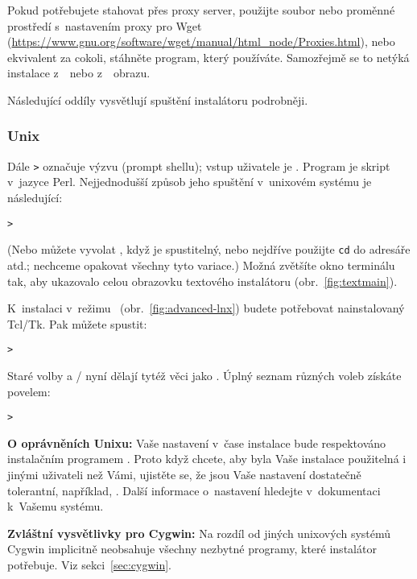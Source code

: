 \documentclass[\classoptions,slovak,english,czech]{\classname}
\begin{document}
Pokud potřebujete stahovat přes proxy server, použijte soubor
 nebo proměnné prostředí s~nastavením proxy pro Wget
(\url{https://www.gnu.org/software/wget/manual/html_node/Proxies.html}),
nebo ekvivalent za cokoli, stáhněte program, který používáte.
Samozřejmě se to netýká instalace z~\DVD\ nebo z~\ISO\ obrazu.

\noindent
Následující oddíly vysvětlují spuštění instalátoru podrobněji.

\subsubsection{Unix}

Dále \texttt{>} označuje výzvu (prompt shellu); vstup 
uživatele je .
Program  je skript v~jazyce Perl. Nejjednodušší
způsob jeho spuštění v~unixovém systému je následující:
\begin{alltt}
> 
\end{alltt}
(Nebo můžete vyvolat , když je spustitelný, 
nebo nejdříve použijte \texttt{cd} do adresáře atd.; 
nechceme opakovat všechny tyto variace.)
Možná zvětšíte okno terminálu tak, aby ukazovalo celou 
obrazovku textového instalátoru (obr.~\ref{fig:textmain}).

K~instalaci v~režimu \GUI\ (obr.~\ref{fig:advanced-lnx}) 
budete potřebovat nainstalovaný Tcl/Tk. Pak můžete spustit:
\begin{alltt}
> 
\end{alltt}

Staré volby  a / nyní dělají tytéž věci jako .
Úplný seznam různých voleb získáte povelem:
\begin{alltt}
> 
\end{alltt}

\textbf{O oprávněních Unixu:} Vaše nastavení  v~čase instalace 
bude respektováno instalačním programem \TL{}. Proto když chcete, aby byla Vaše 
instalace použitelná i jinými uživateli než Vámi, ujistěte se, že jsou Vaše
nastavení dostatečně tolerantní, například, . Další informace o~nastavení  hledejte v~dokumentaci k~Vašemu systému.

\textbf{Zvláštní vysvětlivky pro Cygwin:} Na rozdíl od jiných 
unixových systémů Cygwin implicitně
neobsahuje všechny nezbytné programy, které instalátor \TL{} potřebuje. 
Viz sekci~\ref{sec:cygwin}.
\end{document}
